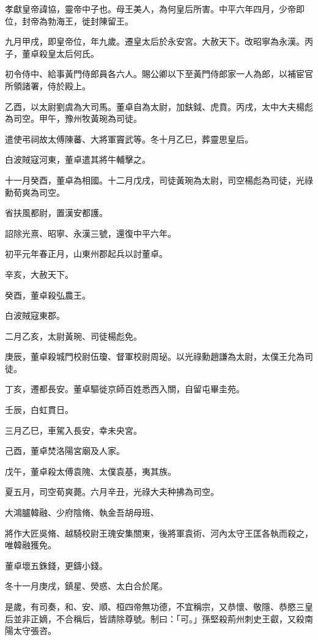
\begin{pinyinscope}
孝獻皇帝諱協，靈帝中子也。母王美人，為何皇后所害。中平六年四月，少帝即位，封帝為勃海王，徙封陳留王。

九月甲戌，即皇帝位，年九歲。遷皇太后於永安宮。大赦天下。改昭寧為永漢。丙子，董卓殺皇太后何氏。

初令侍中、給事黃門侍郎員各六人。賜公卿以下至黃門侍郎家一人為郎，以補宦官所領諸署，侍於殿上。

乙酉，以太尉劉虞為大司馬。董卓自為太尉，加鈇鉞、虎賁。丙戌，太中大夫楊彪為司空。甲午，豫州牧黃琬為司徒。

遣使弔祠故太傅陳蕃、大將軍竇武等。冬十月乙巳，葬靈思皇后。

白波賊寇河東，董卓遣其將牛輔擊之。

十一月癸酉，董卓為相國。十二月戊戌，司徒黃琬為太尉，司空楊彪為司徒，光祿勳荀爽為司空。

省扶風都尉，置漢安都護。

詔除光熹、昭寧、永漢三號，還復中平六年。

初平元年春正月，山東州郡起兵以討董卓。

辛亥，大赦天下。

癸酉，董卓殺弘農王。

白波賊寇東郡。

二月乙亥，太尉黃琬、司徒楊彪免。

庚辰，董卓殺城門校尉伍瓊、督軍校尉周珌。以光祿勳趙謙為太尉，太僕王允為司徒。

丁亥，遷都長安。董卓驅徙京師百姓悉西入關，自留屯畢圭苑。

壬辰，白虹貫日。

三月乙巳，車駕入長安，幸未央宮。

己酉，董卓焚洛陽宮廟及人家。

戊午，董卓殺太傅袁隗、太僕袁基，夷其族。

夏五月，司空荀爽薨。六月辛丑，光祿大夫种拂為司空。

大鴻臚韓融、少府陰脩、執金吾胡母班、

將作大匠吳脩、越騎校尉王瑰安集關東，後將軍袁術、河內太守王匡各執而殺之，唯韓融獲免。

董卓壞五銖錢，更鑄小錢。

冬十一月庚戌，鎮星、熒惑、太白合於尾。

是歲，有司奏，和、安、順、桓四帝無功德，不宜稱宗，又恭懷、敬隱、恭愍三皇后並非正嫡，不合稱后，皆請除尊號。制曰：「可。」孫堅殺荊州刺史王叡，又殺南陽太守張咨。


\end{pinyinscope}
